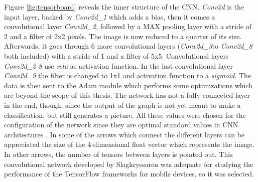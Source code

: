 Figure \ref{fig:tensorboard} reveals the inner structure of the CNN. \textit{Conv2d} is the input layer, backed by \textit{Conv2d\_1} which adds a bias, then it comes a convolutional layer \textit{Conv2d\_2}, followed by a MAX pooling layer with a stride of 2 and a filter of 2x2 pixels. The image is now reduced to a quarter of its size. Afterwards, it goes through 6 more convolutional layers (\textit{Conv2d\_3}to \textit{Conv2d\_8} both included) with a stride of 1 and a filter of 5x5. Convolutional layers \textit{Conv2d\_2-8} use \textit{relu} as activation function. In the last convolutional layer \textit{Conv2d\_9} the filter is changed to 1x1 and activation function to a \textit{sigmoid}. The data is then sent to the Adam module which performs some optimizations which are beyond the scope of this thesis. The network has not a fully connected layer in the end, though, since the output of the graph is not yet meant to make a classification, but still generates a picture. All these values were chosen for the configuration of the network since they are optimal standard values in CNN architectures \cite{cs231n}. In some of the arrows which connect the different layers can be appreciated the size of the 4-dimensional float vector which represents the image. In other arrows, the number of tensors between layers is pointed out. This convolutional network developed by Slagkryssaren was adequate for studying the performance of the TensorFlow frameworks for mobile devices, so it was selected. \\

